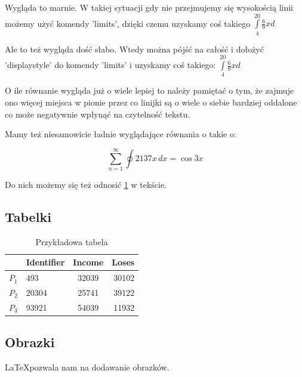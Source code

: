 \documentclass{article}
\begin{document}
Wygląda to marnie. W takiej sytuacji gdy nie przejmujemy się wysokością linii możemy użyć komendy 'limits', dzięki czemu uzyskamy coś takiego $\int\limits_{4}^{20} \frac{6}{9} xd$

Ale to też wygląda dość słabo. Wtedy można pójść na całość i dołożyć 'displaystyle' do komendy 'limits' i uzyskamy coś takiego: $\displaystyle\int\limits_{4}^{20} \frac{6}{9} xd$

O ile równanie wygląda już o wiele lepiej to należy pamiętać o tym, że zajmuje ono więcej miejsca w pionie przez co linijki są o wiele o siebie bardziej oddalone co może negatywnie wpłynąć na czytelność tekstu.

Mamy też niesamowicie ładnie wyglądające równania o takie o:

\begin{equation}
    \sum_{n = 1}^{\infty}  \oint 2137x \, dx = \cos 3x \label{eq:rownanie}
\end{equation}


Do nich możemy się też odnosić \hyperref[eq:rownanie]{1} w tekście.

\subsection{Tabelki}

\begin{table}[]
    \centering
    \caption{Przykładowa tabela}
    \begin{tabular}{|l|l|c|r|}           \hline
              & \textbf{Identifier} & Income & Loses \\ \hline
        $P_1$ & 493                 & 32039  & 30102 \\ \hline
        $P_2$ & 20304               & 25741  & 39122 \\ \hline
        $P_3$ & 93921               & 54039  & 11932 \\ \hline
    \end{tabular}
\end{table}

\pagebreak
\subsection{Obrazki}
\LaTeX pozwala nam na dodawanie obrazków.
\end{document}

